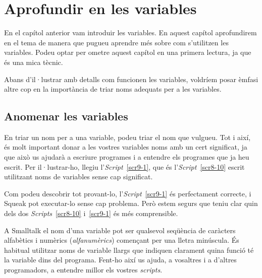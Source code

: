\chapter{Aprofundir en les variables}
\label{cap9}

En el capítol anterior vam introduir les variables. En aquest capítol aprofundirem en el tema de manera que pugueu aprendre més sobre com s'utilitzen les variables. Podeu optar per ometre aquest capítol en una primera lectura, ja que és una mica tècnic.

Abans d'il·lustrar amb detalls com funcionen les variables, voldríem posar èmfasi altre cop en la importància de triar noms adequats per a  les variables.

\section{Anomenar les variables}
En triar un nom per a una variable, podeu triar el nom que vulgueu. Tot i així, és molt important donar a les vostres variables noms amb un cert significat, ja que això us ajudarà a escriure programes i a entendre els programes que ja heu escrit. Per il·lustrar-ho, llegiu l'\emph{Script}~\ref{scr9-1}, que és l'\emph{Script}~\ref{scr8-10} escrit utilitzant noms de variables sense cap significat.

Com podeu descobrir tot provant-lo, l'\emph{Script}~\ref{scr9-1} és perfectament correcte, i Squeak pot executar-lo sense cap problema. Però estem segurs que teniu clar quin dels dos \emph{Scripts}~\ref{scr8-10} i~\ref{scr9-1} és més comprensible.

A Smalltalk el nom d'una variable pot ser qualsevol seqüència de caràcters alfabètics i numèrics (\emph{alfanumèrics}) començant per una lletra minúscula. És habitual utilitzar noms de variable llargs que indiquen clarament quina funció té la variable dins del programa. Fent-ho així us ajuda, a vosaltres i a d'altres programadors, a entendre millor els vostres \emph{scripts}.

